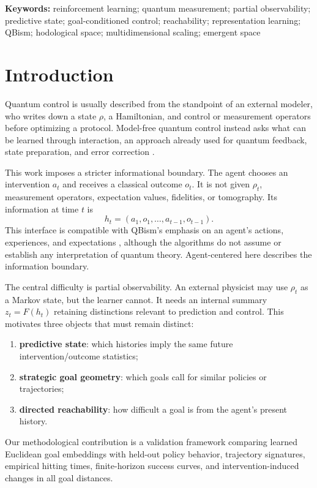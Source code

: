 \documentclass[11pt]{article}
\begin{document}
\noindent\textbf{Keywords:} reinforcement learning; quantum measurement;
partial observability; predictive state; goal-conditioned control;
reachability; representation learning; QBism; hodological space;
multidimensional scaling; emergent space

\tableofcontents
\newpage

\section{Introduction}

Quantum control is usually described from the standpoint of an external
modeler, who writes down a state $\rho$, a Hamiltonian, and control or
measurement operators before optimizing a protocol. Model-free quantum control
instead asks what can be learned through interaction, an approach already used
for quantum feedback, state preparation, and error correction
\cite{fosel2018,sivak2022,borah2021}.

This work imposes a stricter informational boundary. The agent chooses an
intervention $a_t$ and receives a classical outcome $o_t$. It is not given
$\rho_t$, measurement operators, expectation values, fidelities, or
tomography. Its information at time $t$ is
\begin{equation}
 h_t=(a_1,o_1,\ldots,a_{t-1},o_{t-1}). \label{eq:history}
\end{equation}
This interface is compatible with QBism's emphasis on an agent's actions,
experiences, and expectations \cite{fuchs2014}, although the algorithms do not
assume or establish any interpretation of quantum theory. Agent-centered here
describes the information boundary.

The central difficulty is partial observability. An external physicist may use
$\rho_t$ as a Markov state, but the learner cannot. It needs an internal
summary $z_t=F(h_t)$ retaining distinctions relevant to prediction and control.
This motivates three objects that must remain distinct:
\begin{enumerate}
 \item \textbf{predictive state}: which histories imply the same future
 intervention/outcome statistics;
 \item \textbf{strategic goal geometry}: which goals call for similar policies
 or trajectories;
 \item \textbf{directed reachability}: how difficult a goal is from the
 agent's present history.
\end{enumerate}
Our methodological contribution is a validation framework comparing learned
Euclidean goal embeddings with held-out policy behavior, trajectory
signatures, empirical hitting times, finite-horizon success curves, and
intervention-induced changes in all goal distances.
\end{document}
